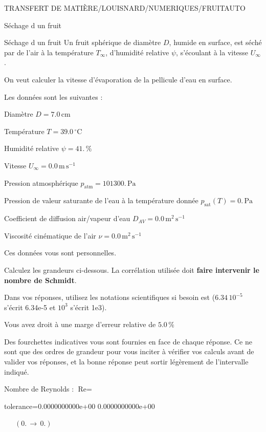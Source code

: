 \documentclass[12pt]{article}
\begin{document}
\begin{quiz}{TRANSFERT DE MATIÈRE/LOUISNARD/NUMERIQUES/FRUITAUTO}
\begin{cloze}{Séchage d un fruit}
\end{cloze} 


 \begin{cloze}{Séchage d un fruit} 
Un fruit sphérique de diamètre $D$, humide en surface, est séché par de l'air à la température $T_\infty$, d'humidité relative $\psi$, s'écoulant à la vitesse $U_\infty$.

On veut calculer la vitesse d'évaporation de la pellicule d'eau en surface.

 

Les données sont les suivantes :

 

Diamètre $D = 7.0\,  \mathrm{cm} $

Température $T = 39.0\,  \mathrm{^\circ\mathrm{C}} $

Humidité relative $\psi = 41.\, \% $

Vitesse $U_\infty = 0.0\,  \mathrm{m}\,  \mathrm{s}^{-1} $

Pression atmosphérique $p_{\text{atm}} = 101300.\,  \mathrm{Pa} $

Pression de valeur saturante de l’eau à la température donnée $p_{\text{sat}}(T) = 0.\,  \mathrm{Pa} $

Coefficient de diffusion air/vapeur d’eau $D_{AV} = 0.0\,  \mathrm{m}^{2}\,  \mathrm{s}^{-1} $

Viscosité cinématique de l’air $\nu = 0.0\,  \mathrm{m}^{2}\,  \mathrm{s}^{-1} $

Ces données vous sont personnelles.

 

Calculez les grandeurs ci-dessous. La corrélation utilisée doit \textbf{faire intervenir le nombre de Schmidt}.

Dans vos réponses, utilisez les notations scientifiques si besoin est ($6.34\, 10^{-5}$ s'écrit 6.34e-5 et $10^{3}$ s'écrit 1e3).

Vous avez droit à une marge d'erreur relative de $5.0\, \% $

Des fourchettes indicatives vous sont fournies en face de chaque réponse. Ce ne sont que des ordres de grandeur pour vous inciter à vérifier vos calculs avant de valider vos réponses, et la bonne réponse peut sortir légèrement de l'intervalle indiqué.

 

Nombre de Reynolds : $\text{Re} =  $
\begin{numerical}[points=1] 
\item[tolerance={0.0000000000e+00}] 0.0000000000e+00 
\end{numerical} 
 $\,$ 
 $ \quad (0. \, \rightarrow \, 0.) $ 


\end{cloze}
\end{quiz}
\end{document}
